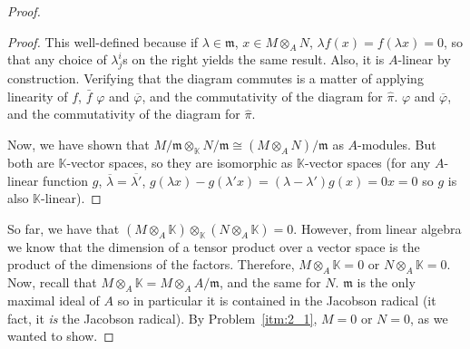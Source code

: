 \begin{problem}
\begin{enumerate}[label=(\theproblem.\arabic*),ref=\theproblem.\arabic*]
\begin{sol}
\begin{proof}
\begin{claim}
\begin{proof}
                                This well-defined because if ${\lambda \in \mathfrak{m}}$, ${x \in M \otimes_A N}$, ${\lambda f(x) = f(\lambda x) = 0}$,
                                so that any choice of $\lambda^i_j$s on the right yields the same result.
                                Also, it is $A$-linear by construction.
                                Verifying that the diagram commutes is a matter of applying linearity of $f$, $\bar{f}$
                                $\varphi$ and $\overline{\varphi}$, and the commutativity of the diagram for $\hat{\pi}$.
                                $\varphi$ and $\overline{\varphi}$, and the commutativity of the diagram for $\hat{\pi}$.

                                Now, we have shown that $M/\mathfrak{m} \otimes_\mathbb{K} N/\mathfrak{m} \cong (M \otimes_A N)/\mathfrak{m}$ as $A$-modules.
                                But both are $\mathbb{K}$-vector spaces, so they are isomorphic as $\mathbb{K}$-vector spaces (for any $A$-linear function $g$,
                                $\overline{\lambda} = \overline{\lambda'}$,
                                $g(\lambda x) - g(\lambda'x) = (\lambda - \lambda') g(x) = 0x = 0$ so $g$ is also $\mathbb{K}$-linear).
                            \end{proof}
                    \end{claim}

                    So far, we have that $ (M \otimes_A \mathbb{K}) \otimes_\mathbb{K}( N \otimes_A \mathbb{K}) = 0$.
                    However, from linear algebra we know that the dimension of a tensor product over a vector space
                    is the product of the dimensions of the factors.
                    Therefore, $M \otimes_A \mathbb{K} = 0$ or $N \otimes_A \mathbb{K} = 0$.
                    Now, recall that $M \otimes_A \mathbb{K} = M \otimes_A A/\mathfrak{m} $, and the same for $N$.
                    $\mathfrak{m}$ is the only maximal ideal of $A$ so in particular it is contained in the Jacobson radical (it fact, it \emph{is} the Jacobson radical).
                    By Problem~\ref{itm:2_1}, $M = 0$ or $N = 0$, as we wanted to show.




\end{proof}
\end{sol}
\end{enumerate}
\end{problem}
